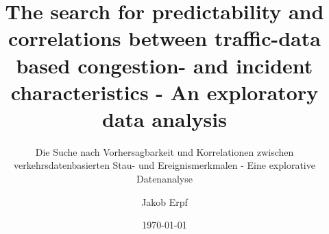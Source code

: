 \titlehead{\centering Technical Universtity of Munich}
\subject{Master's Thesis}
\title{The search for predictability and correlations between traffic-data based congestion- and incident characteristics - An exploratory data analysis}
\subtitle{Die Suche nach Vorhersagbarkeit und Korrelationen zwischen verkehrsdatenbasierten Stau- und Ereignismerkmalen - Eine explorative Datenanalyse}
\author{Jakob Erpf}
\date{\today}
\publishers{...}
\maketitle